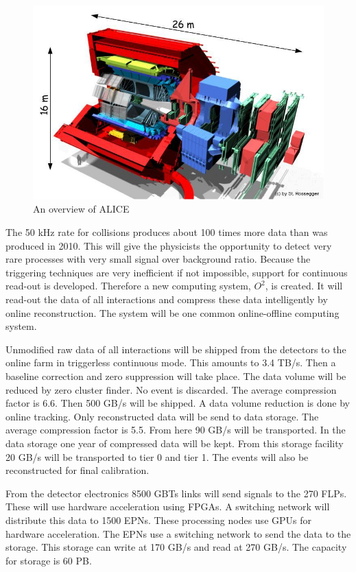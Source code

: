 \begin{figure}[h]
  \begin{center}
    \includegraphics[scale=0.4]{./images/alice_upgrade.jpg}
    \caption{An overview of ALICE}
    \label{fig:overview}
  \end{center}
\end{figure}
The 50 kHz rate for collisions produces about 100 times more data than was produced in 2010. This will give the physicists the opportunity to detect very rare processes with very small signal over background ratio. Because the triggering techniques are very inefficient if not impossible, support for continuous read-out is developed. Therefore a new computing system, $O^2$, is created. It will read-out the data of all interactions and compress these data intelligently by online reconstruction. The system will be one common online-offline computing system.

Unmodified raw data of all interactions will be shipped from the detectors to the online farm in triggerless continuous mode. This  amounts to 3.4 TB/s. Then a baseline correction and zero suppression will take place. The data volume will be reduced by zero cluster finder. No event is discarded. The average compression factor is 6.6. Then 500 GB/s will be shipped. A data volume reduction is done by online tracking. Only reconstructed data will be send to data storage. The average compression factor is 5.5. From here 90 GB/s will be transported. In the data storage one year of compressed data will be kept. From this storage facility 20 GB/s will be transported to tier 0 and tier 1. The events will also be reconstructed for final calibration.

From the detector electronics 8500 GBTs links will send signals to the 270 FLPs. These will use hardware acceleration using FPGAs. A switching network will distribute this data to 1500 EPNs. These processing nodes use GPUs for hardware acceleration. The EPNs use a switching network to send the data to the storage. This storage can write at 170 GB/s and read at 270 GB/s. The capacity for storage is 60 PB.


